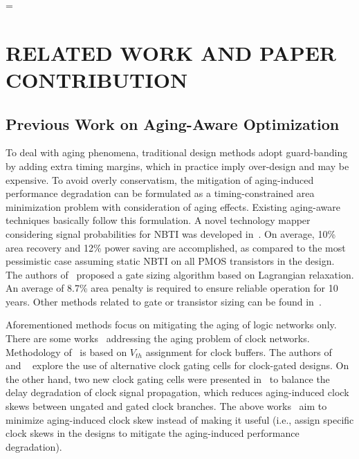 =\section{RELATED WORK AND PAPER CONTRIBUTION}
\label{sec:related}
\subsection{Previous Work on Aging-Aware Optimization}
\label{subsec:rw}
To deal with aging phenomena, traditional design methods adopt guard-banding by adding extra timing margins, which in practice imply over-design and may be expensive. To avoid overly conservatism, the mitigation of aging-induced performance degradation can be formulated as a timing-constrained area minimization problem with consideration of aging effects. Existing aging-aware techniques basically follow this formulation. A novel technology mapper considering signal probabilities for NBTI was developed in~\cite{kumar2007nbti}. On average, 10\% area recovery and 12\% power saving are accomplished, as compared to the most pessimistic case assuming static NBTI on all PMOS transistors in the design. The authors of~\cite{paul2006temporal} proposed a gate sizing algorithm based on Lagrangian relaxation. An average of 8.7\% area penalty is required to ensure reliable operation for 10 years. Other methods related to gate or transistor sizing can be found in~\cite{kang2007efficient, yang2007combating}.

Aforementioned methods focus on mitigating the aging of logic networks only. There are some works~\cite{huang2013low, chakraborty2013skew,chen2013novel} addressing the aging problem of clock networks. Methodology of~\cite{chen2013novel} is based on $V_{th}$ assignment for clock buffers. The authors of ~\cite{huang2013low} and ~\cite{chakraborty2013skew} explore the use of alternative clock gating cells for clock-gated designs. On the other hand, two new clock gating cells were presented in~\cite{lai2014bti} to balance the delay degradation of clock signal propagation, which reduces aging-induced clock skews between ungated and gated clock branches. The above works~\cite{huang2013low, chakraborty2013skew,chen2013novel,lai2014bti} aim to minimize aging-induced clock skew instead of making it useful (i.e., assign specific clock skews in the designs to mitigate the aging-induced performance degradation).

